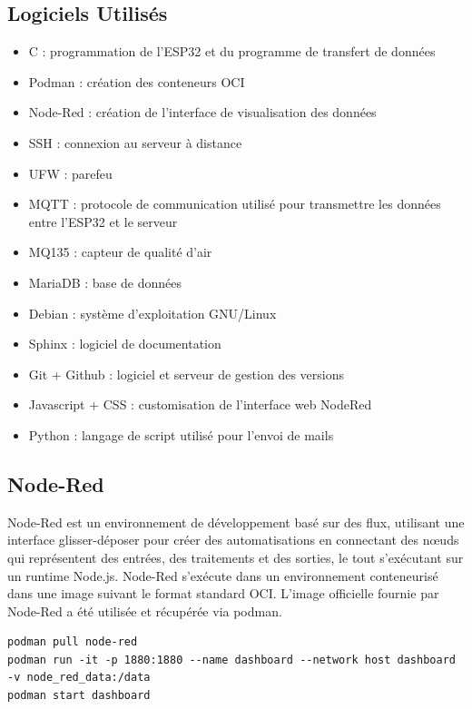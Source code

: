\documentclass[a4paper,11pt]{article}
\begin{document}
        \subsection{Logiciels Utilisés}
        \begin{itemize}
            \item C : programmation de l'ESP32 et du programme de transfert de données
            \item Podman : création des conteneurs OCI
            \item Node-Red : création de l'interface de visualisation des données
            \item SSH : connexion au serveur à distance 
            \item UFW : parefeu
            \item MQTT : protocole de communication utilisé pour transmettre les données entre l'ESP32 et le serveur
            \item MQ135 : capteur de qualité d'air 
            \item MariaDB : base de données 
            \item Debian : système d'exploitation GNU/Linux
            \item Sphinx : logiciel de documentation 
            \item Git + Github : logiciel et serveur de gestion des versions
            \item Javascript + CSS : customisation de l'interface web NodeRed
            \item Python : langage de script utilisé pour l'envoi de mails
        \end{itemize}

        \newpage
        \subsection{Node-Red}
        \vspace{0.5cm}
        Node-Red est un environnement de développement basé sur des flux, utilisant une interface glisser-déposer pour créer des automatisations en connectant des nœuds qui représentent des entrées, des traitements et des sorties, le tout s'exécutant sur un runtime Node.js.
        \newline
        Node-Red s'exécute dans un environnement conteneurisé dans une image suivant le format standard OCI. L'image officielle fournie par Node-Red a été utilisée et récupérée via podman.
        \vspace{0.5cm}
        \begin{lstlisting}[style=bash, caption={Podman création \& lancement du conteneur Node-Red}, label={lst:podman_node_red}]
podman pull node-red
podman run -it -p 1880:1880 --name dashboard --network host dashboard -v node_red_data:/data
podman start dashboard
        \end{lstlisting}
\end{document}
